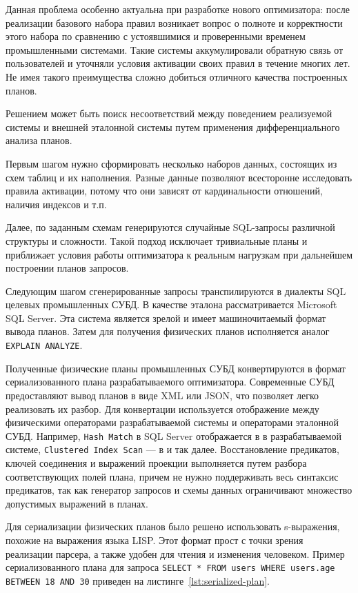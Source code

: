 \documentclass[14pt, russian]{scrartcl}
\begin{document}
Данная проблема особенно актуальна при разработке нового оптимизатора: после
реализации базового набора правил возникает вопрос о полноте и корректности
этого набора по сравнению с устоявшимися и проверенными временем промышленными
системами. Такие системы аккумулировали обратную связь от пользователей и
уточняли условия активации своих правил в течение многих лет. Не имея такого
преимущества сложно добиться отличного качества построенных планов.

Решением может быть поиск несоответствий между поведением реализуемой системы и
внешней эталонной системы путем применения дифференциального анализа планов.

Первым шагом нужно сформировать несколько наборов данных, состоящих из схем
таблиц и их наполнения. Разные данные позволяют всесторонне исследовать правила
активации, потому что они зависят от кардинальности отношений, наличия индексов
и т.п.

Далее, по заданным схемам генерируются случайные SQL-запросы различной структуры
и сложности. Такой подход исключает тривиальные планы и приближает условия
работы оптимизатора к реальным нагрузкам при дальнейшем построении планов
запросов.

Следующим шагом сгенерированные запросы транспилируются в диалекты SQL целевых
промышленных СУБД. В качестве эталона рассматривается Microsoft SQL Server. Эта
система является зрелой и имеет машиночитаемый формат вывода планов. Затем для
получения физических планов исполняется аналог \texttt{EXPLAIN ANALYZE}.

Полученные физические планы промышленных СУБД конвертируются в формат
сериализованного плана разрабатываемого оптимизатора. Современные СУБД
предоставляют вывод планов в виде XML или JSON, что позволяет легко реализовать
их разбор. Для конвертации используется отображение между физическими
операторами разрабатываемой системы и операторами эталонной СУБД. Например,
\texttt{Hash Match} в SQL Server отображается в \HashJoin{} в разрабатываемой
системе, \texttt{Clustered Index Scan} --- в \IndexScan{} и так далее.
Восстановление предикатов, ключей соединения и выражений проекции выполняется
путем разбора соответствующих полей плана, причем не нужно поддерживать весь
синтаксис предикатов, так как генератор запросов и схемы данных ограничивают
множество допустимых выражений в планах.

Для сериализации физических планов было решено использовать s-выражения, похожие
на выражения языка LISP. Этот формат прост с точки зрения реализации парсера, а
также удобен для чтения и изменения человеком. Пример сериализованного плана для
запроса \texttt{SELECT * FROM users WHERE users.age BETWEEN 18 AND 30} приведен
на листинге~\ref{lst:serialized-plan}.
\end{document}
